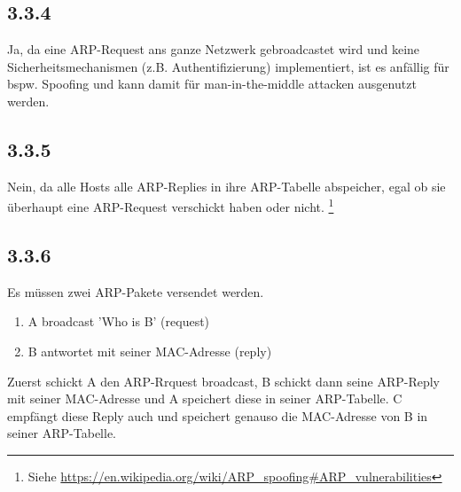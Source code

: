 \documentclass[a4paper,url]{article}
\begin{document}
\subsection*{3.3.4}
Ja, da eine ARP-Request ans ganze Netzwerk gebroadcastet wird und keine Sicherheitsmechanismen (z.B. Authentifizierung) implementiert, ist es anfällig für bspw. Spoofing und kann damit für man-in-the-middle attacken ausgenutzt werden.

\subsection*{3.3.5}
Nein, da alle Hosts alle ARP-Replies in ihre ARP-Tabelle abspeicher, egal ob sie überhaupt eine ARP-Request verschickt haben oder nicht. \footnote{Siehe \href{https://en.wikipedia.org/wiki/ARP_spoofing#ARP_vulnerabilities}{https://en.wikipedia.org/wiki/ARP\_spoofing\#ARP\_vulnerabilities}}

\subsection*{3.3.6}
Es müssen zwei ARP-Pakete versendet werden.
\begin{enumerate}
	\item A broadcast 'Who is B' (request)
	\item B antwortet mit seiner MAC-Adresse (reply)
\end{enumerate}
Zuerst schickt A den ARP-Rrquest broadcast, B schickt dann seine ARP-Reply mit seiner MAC-Adresse und A speichert diese in seiner ARP-Tabelle. C empfängt diese Reply auch und speichert genauso die MAC-Adresse von B in seiner ARP-Tabelle.
\end{document}
